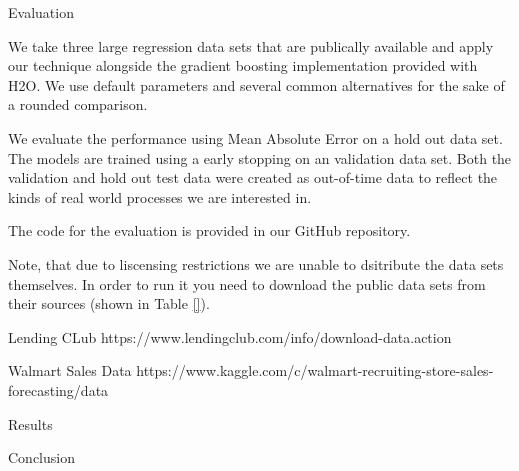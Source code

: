   

Evaluation

We take three large regression data sets that are publically available 
and apply our technique alongside the gradient boosting implementation
provided with H2O. We use default parameters and several common alternatives
for the sake of a rounded comparison. 

We evaluate the performance using Mean Absolute Error on a hold out data set.
The models are trained using a early stopping on an validation data set. Both
the validation and hold out test data were created as out-of-time data to reflect
the kinds of real world processes we are interested in. 

The code for the evaluation is provided in our GitHub repository. 


Note, that due to liscensing restrictions we are unable to dsitribute the data sets
themselves. In order to run
it you need to download the public data sets from their sources (shown in Table \ref{}).

Lending CLub
https://www.lendingclub.com/info/download-data.action

Walmart Sales Data
https://www.kaggle.com/c/walmart-recruiting-store-sales-forecasting/data






Results

Conclusion


